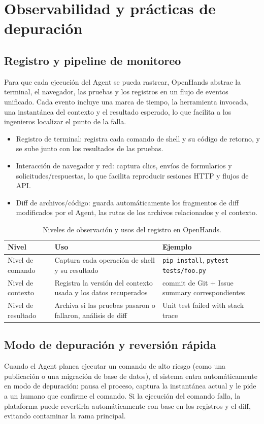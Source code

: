 \section{Observabilidad y prácticas de depuración}
\subsection{Registro y pipeline de monitoreo}
Para que cada ejecución del Agent se pueda rastrear, OpenHands abstrae la terminal, el navegador, las pruebas y los registros en un flujo de eventos unificado. Cada evento incluye una marca de tiempo, la herramienta invocada, una instantánea del contexto y el resultado esperado, lo que facilita a los ingenieros localizar el punto de la falla.

\begin{itemize}
    \item Registro de terminal: registra cada comando de shell y su código de retorno, y se sube junto con los resultados de las pruebas.
    \item Interacción de navegador y red: captura clics, envíos de formularios y solicitudes/respuestas, lo que facilita reproducir sesiones HTTP y flujos de API.
    \item Diff de archivos/código: guarda automáticamente los fragmentos de diff modificados por el Agent, las rutas de los archivos relacionados y el contexto.
\end{itemize}

\begin{table}[H]
\centering
\begin{tabular}{p{} p{} p{}}
\toprule
Nivel & Uso & Ejemplo \\
\midrule
Nivel de comando & Captura cada operación de shell y su resultado & \texttt{pip install}, \texttt{pytest tests/foo.py} \\
\midrule
Nivel de contexto & Registra la versión del contexto usada y los datos recuperados & commit de Git + Issue summary correspondientes \\
\midrule
Nivel de resultado & Archiva si las pruebas pasaron o fallaron, análisis de diff & Unit test failed with stack trace \\
\bottomrule
\end{tabular}
\caption{Niveles de observación y usos del registro en OpenHands.}
\end{table}

\subsection{Modo de depuración y reversión rápida}
Cuando el Agent planea ejecutar un comando de alto riesgo (como una publicación o una migración de base de datos), el sistema entra automáticamente en modo de depuración: pausa el proceso, captura la instantánea actual y le pide a un humano que confirme el comando. Si la ejecución del comando falla, la plataforma puede revertirla automáticamente con base en los registros y el diff, evitando contaminar la rama principal.

